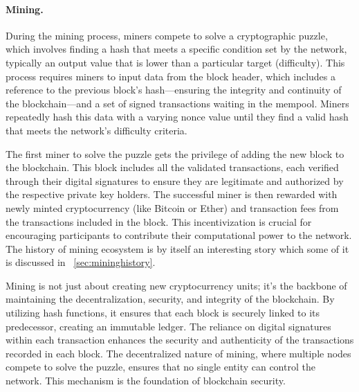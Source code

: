 \paragraph{Mining.}

During the mining process, miners compete to solve a cryptographic puzzle, which involves finding a hash that meets a specific condition set by the network, typically an output value that is lower than a particular target (difficulty). This process requires miners to input data from the block header, which includes a reference to the previous block's hash---ensuring the integrity and continuity of the blockchain---and a set of signed transactions waiting in the mempool. Miners repeatedly hash this data with a varying nonce value until they find a valid hash that meets the network's difficulty criteria.

The first miner to solve the puzzle gets the privilege of adding the new block to the blockchain. This block includes all the validated transactions, each verified through their digital signatures to ensure they are legitimate and authorized by the respective private key holders. The successful miner is then rewarded with newly minted cryptocurrency (like Bitcoin or Ether) and transaction fees from the transactions included in the block. This incentivization is crucial for encouraging participants to contribute their computational power to the network. The history of mining ecosystem is by itself an interesting story which some of it is discussed in ~\ref{sec:mininghistory}.



Mining is not just about creating new cryptocurrency units; it's the backbone of maintaining the decentralization, security, and integrity of the blockchain. By utilizing hash functions, it ensures that each block is securely linked to its predecessor, creating an immutable ledger. The reliance on digital signatures within each transaction enhances the security and authenticity of the transactions recorded in each block. The decentralized nature of mining, where multiple nodes compete to solve the puzzle, ensures that no single entity can control the network. This mechanism is the foundation of blockchain security.



